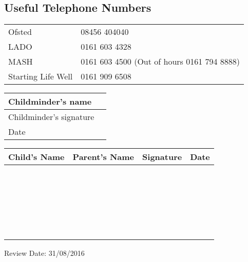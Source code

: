 \subsection{Useful Telephone Numbers}

\begin{table}[h]
  \begin{tabularx}{\textwidth}{lX}
    Ofsted & 08456 404040 \\
    LADO & 0161 603 4328 \\
    MASH & 0161 603 4500 (Out of hours 0161 794 8888) \\
    Starting Life Well & 0161 909 6508 \\ 
 \end{tabularx}
\end{table}

\begin{table}[h]
  \def\arraystretch{2.0}
  \begin{tabularx}{\textwidth}{|l|X|}
    \hline
    Childminder's name & \\
    \hline
    Childminder's signature &  \\
    \hline
    Date & \\
    \hline
  \end{tabularx}
\end{table}

\begin{table}[H]
  \def\arraystretch{2.0}
  \begin{tabularx}{\textwidth}{|X|X|X|X|}
    \hline
    Child's Name & Parent's Name & Signature & Date \\
    \hline
    ~ & ~ & ~ & \\
    \hline
    ~ & ~ & ~ & \\
    \hline
    ~ & ~ & ~ & \\
    \hline
    ~ & ~ & ~ & \\
    \hline
    ~ & ~ & ~ & \\
    \hline
  \end{tabularx}
\end{table}

Review Date: 31/08/2016


